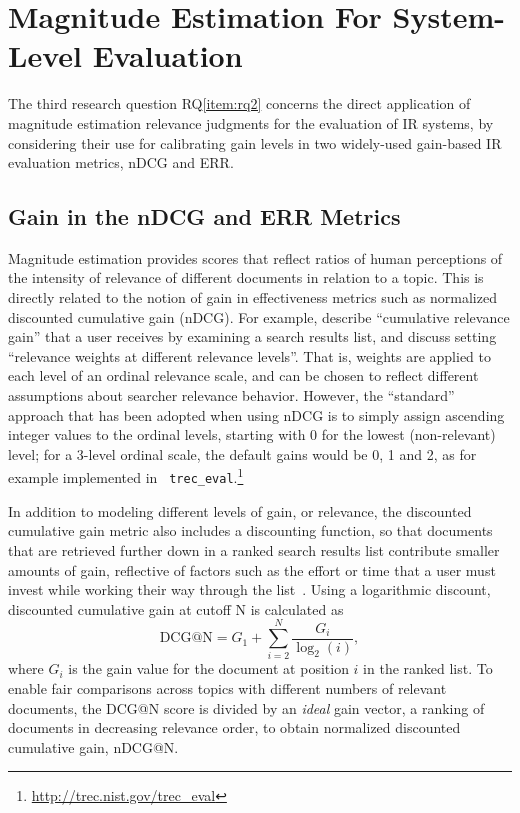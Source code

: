 
\section{Magnitude Estimation For System-Level Evaluation}
\label{sec:rq2}

The third research question RQ\ref{item:rq2} concerns the direct
application of magnitude estimation relevance judgments for the
evaluation of IR systems, by considering their use for calibrating
gain levels in two widely-used gain-based IR evaluation metrics, nDCG
and ERR.


\subsection{Gain in the nDCG and ERR Metrics}
\label{sec:ndcg-err}

Magnitude estimation provides scores
that reflect ratios of human perceptions of the intensity 
of relevance of
different documents in relation to a topic.
This is directly related to the notion of gain in effectiveness metrics
such as normalized discounted cumulative gain (nDCG).
For example, 
\citet{JarKek02} describe ``cumulative relevance gain'' that a user
receives by examining a search results list, and discuss setting
``relevance weights at different relevance levels''.
That is, weights are applied to each level of an ordinal relevance scale,
and can be chosen to reflect different assumptions about searcher
relevance behavior.
However, the ``standard'' approach that has been adopted when using nDCG
is to simply assign ascending integer values to the ordinal levels,
starting with 0 for the lowest (non-relevant) level; for a 3-level
ordinal scale, the default gains would be 0, 1 and 2, as for example
implemented in {\tt
trec\_eval}.\footnote{\url{http://trec.nist.gov/trec_eval}}

In addition to modeling different levels of gain, or relevance,
the discounted cumulative gain metric also includes a discounting
function, 
so that documents that are retrieved further down in a ranked search
results list contribute smaller amounts of gain, reflective of 
factors such as the effort or time that a user must invest while working
their way through the list~\cite{JarKek02}.
Using a logarithmic discount, discounted cumulative gain
at cutoff N is calculated as 
\[
\mathrm{DCG@N} = G_1 + \sum^{N}_{i=2} \frac{G_i}{\log_2(i)},
\]
\noindent where $G_i$ is the gain value for the document at position $i$
in the ranked list. To enable fair comparisons
across topics with different numbers of relevant documents, the DCG@N
score is divided by an \emph{ideal} gain vector, a
ranking of documents in decreasing relevance order, to obtain normalized
discounted cumulative gain, nDCG@N.


